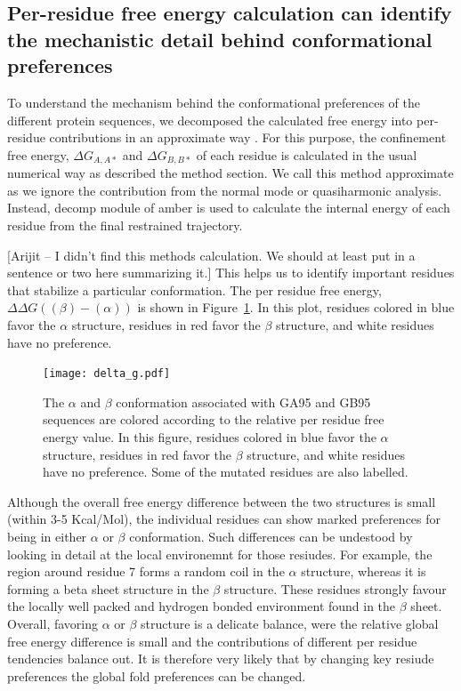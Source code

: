 \documentclass[12pt]{article}
\newcommand{\Ken}[1]{\color{red}#1\normalcolor}
\begin{document}
\subsection{Per-residue free energy calculation can identify the mechanistic detail behind
conformational preferences} \label{sec:orban_per_residue}

To understand the mechanism behind the conformational preferences of the different protein
sequences, we decomposed the calculated free energy into per-residue contributions in
an approximate way \cite{Tyka2006}. For this purpose, the confinement free energy, $\Delta G_{A,A*}$ and
$\Delta G_{B,B*}$ of each residue is calculated in the usual numerical way as described
the method section. We call this method approximate as we ignore the contribution from the normal 
mode or quasiharmonic analysis. Instead, decomp module of amber is used to calculate the internal energy 
of each residue from the final restrained trajectory. 

\Ken{[Arijit -- I didn't find this methods calculation.  We should at least put in a sentence or two here summarizing it.]}  
This helps us to identify important residues that stabilize a particular
conformation. The per residue free energy, $\Delta \Delta G ((\beta) - (\alpha))$ is
shown in Figure~\ref{fig:perresidue_orban}. 
In this plot, residues colored in blue favor the $\alpha$ structure, residues in red favor the $\beta$ structure, and white residues
have no preference.


\begin{figure}
\begin{center}
\texttt{[image: delta\_g.pdf]}
\end{center}
\caption{The $\alpha$ and $\beta$ conformation associated with GA95 and GB95 sequences are colored according to the relative per residue
free energy value. In this figure, residues colored in blue favor the $\alpha$ structure, residues in red favor the $\beta$ structure, and 
white residues have no preference. Some of the mutated residues are also labelled.}
\label{fig:perresidue_orban}
\end{figure}

Although the overall free energy difference between the two structures is small (within 3-5 Kcal/Mol), the individual residues 
can show marked preferences for being in either $\alpha$ or $\beta$
conformation. Such differences can be undestood by looking in detail at the local environemnt for
those resiudes. For example, the region around residue 7 forms a random coil in the $\alpha$
structure, whereas it is forming a beta sheet structure in the $\beta$ structure. These residues
strongly favour the locally well packed and hydrogen bonded environment found in the $\beta$ sheet.
Overall, favoring $\alpha$ or $\beta$ structure is a delicate balance, were the relative global free
energy difference is small and the contributions of different per residue tendencies balance out. It
is therefore very likely that by changing key resiude preferences the global fold preferences can be
changed.
\end{document}
